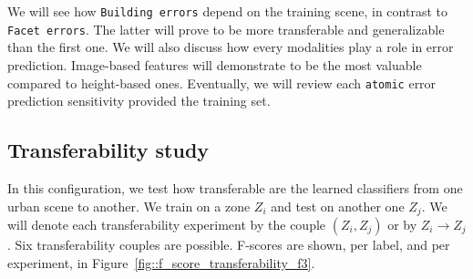     We will see how \texttt{Building errors} depend on the training scene, in contrast to \texttt{Facet errors}.
    The latter will prove to be more transferable and generalizable than the first one.
    We will also discuss how every modalities play a role in error prediction.
    Image-based features will demonstrate to be the most valuable compared to height-based ones.
    Eventually, we will review each \texttt{atomic} error prediction sensitivity provided the training set.

    \subsection{Transferability study}
        \label{subsec::more_experiments::scalability::transferability}
        In this configuration, we test how transferable are the learned classifiers from one urban scene to another.
        We train on a zone $Z_i$ and test on another one $Z_j$.
        We will denote each transferability experiment by the couple $(Z_i, Z_j)$ or by $Z_i \rightarrow Z_j$.
        Six transferability couples are possible.
        F-scores are shown, per label, and per experiment, in Figure~\ref{fig::f_score_transferability_f3}.\\
        
        \begin{figure}[htbp]
        \end{figure}


